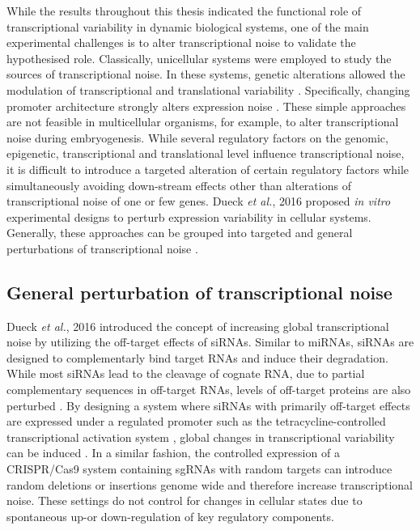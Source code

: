 While the results throughout this thesis indicated the functional role of transcriptional variability in dynamic biological systems, one of the main experimental challenges is to alter transcriptional noise to validate the hypothesised role. Classically, unicellular systems were employed to study the sources of transcriptional noise. In these systems, genetic alterations allowed the modulation of transcriptional and translational variability \cite{Raser2004, Raser2005, Ozbudak2002, Hornung2012}. Specifically, changing promoter architecture strongly alters expression noise \cite{Jones2014, Sharon2014}. These simple approaches are not feasible in multicellular organisms, for example, to alter transcriptional noise during embryogenesis. While several regulatory factors on the genomic, epigenetic, transcriptional and translational level influence transcriptional noise, it is difficult to introduce a targeted alteration of certain regulatory factors while simultaneously avoiding down-stream effects other than alterations of transcriptional noise of one or few genes. Dueck \emph{et al.}, 2016 proposed \emph{in vitro} experimental designs to perturb expression variability in cellular systems. Generally, these approaches can be grouped into targeted and general perturbations of transcriptional noise \citep{Dueck2016}.

\subsection{General perturbation of transcriptional noise} 

Dueck \emph{et al.}, 2016 introduced the concept of increasing global transcriptional noise by utilizing the off-target effects of \glspl{siRNA}. Similar to miRNAs, siRNAs are designed to complementarly bind target RNAs and induce their degradation. While most siRNAs lead to the cleavage of cognate RNA, due to partial complementary sequences in off-target RNAs, levels of off-target proteins are also perturbed \citep{Scacheri2004}. By designing a system where siRNAs with primarily off-target effects are expressed under a regulated promoter such as the tetracycline-controlled transcriptional activation system \citep{Gossen1995}, global changes in transcriptional variability can be induced \citep{Dueck2016}. In a similar fashion, the controlled expression of a CRISPR/Cas9 system containing \glspl{sgRNA} with random targets can introduce random deletions or insertions genome wide and therefore increase transcriptional noise. These settings do not control for changes in cellular states due to spontaneous up-or down-regulation of key regulatory components. 

